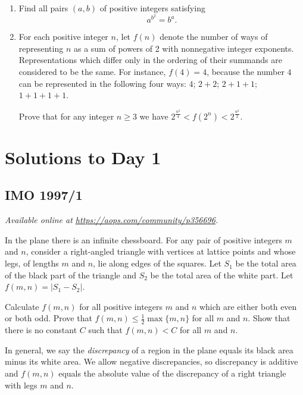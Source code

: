 \documentclass[11pt]{scrartcl}
\begin{document}
\begin{enumerate}[\bfseries 1.]
\item %
Find all pairs $(a,b)$ of positive integers satisfying
\[ a^{b^2} = b^a. \]

\item %
For each positive integer $n$,
let $f(n)$ denote the number of ways of representing $n$
as a sum of powers of 2 with nonnegative integer exponents.
Representations which differ only in the ordering
of their summands are considered to be the same.
For instance, $f(4) = 4$,
because the number $4$ can be represented in the following four ways:
$4$; $2+2$; $2+1+1$; $1+1+1+1$.

Prove that for any integer $n \geq 3$
we have $2^{\frac{n^2}{4}} < f(2^n) < 2^{\frac{n^2}2}$.

\end{enumerate}
\pagebreak

\section{Solutions to Day 1}
\subsection{IMO 1997/1}
\textsl{Available online at \url{https://aops.com/community/p356696}.}
\begin{mdframed}[style=mdpurplebox,frametitle={Problem statement}]
In the plane there is an infinite chessboard.
For any pair of positive integers $m$ and $n$,
consider a right-angled triangle with vertices at lattice points
and whose legs, of lengths $m$ and $n$, lie along edges of the squares.
Let $S_1$ be the total area of the black part of the triangle
and $S_2$ be the total area of the white part.
Let $f(m,n) = | S_1 - S_2 |$.


\begin{enumerate}[(a)]
  \ii Calculate $f(m,n)$ for all positive integers $m$ and $n$
  which are either both even or both odd.
  \ii Prove that $f(m,n) \leq \frac 12 \max \{m,n\}$ for all $m$ and $n$.
  \ii Show that there is no constant $C$
  such that $f(m,n) < C$ for all $ m$ and $ n$.
\end{enumerate}
\end{mdframed}
In general, we say the \emph{discrepancy} of a region in the plane
equals its black area minus its white area.
We allow negative discrepancies,
so discrepancy is additive and $f(m,n)$ equals the absolute value
of the discrepancy of a right triangle with legs $m$ and $n$.
\end{document}
